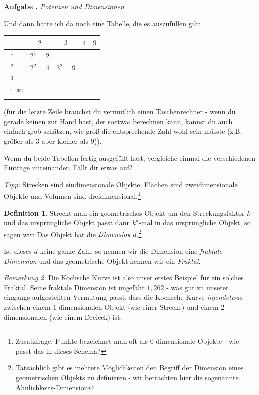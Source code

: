 \documentclass[a4paper,ngerman,12pt]{scrartcl}
\theoremstyle{definition}
\newtheorem{defn}{Definition}[]
\theoremstyle{plain}
\theoremstyle{remark}
\newtheorem{bem}[defn]{Bemerkung}
\newlength{\aufgabenskip}
\newcounter{aufgabennummer}
\newenvironment{aufgabe}[1]{
  \addtocounter{aufgabennummer}{1}
  \textbf{Aufgabe \theaufgabennummer.} \emph{#1} \par
}{\vspace{\aufgabenskip}}
\begin{document}
\begin{aufgabe}{Potenzen und Dimensionen}
Und dann hätte ich da noch eine Tabelle, die es auszufüllen gilt:
\begin{center}
	\renewcommand{\arraystretch}{2}
	\begin{tabular}{l||c|c|c|c}
				      & $2$ & $3$ & $4$ & $9$ \\\hline\hline
		$\boxed{\phantom{1}}^1$  & $2^1=2$	&   &  & \\\hline
		$\boxed{\phantom{1}}^2$  & $2^2=4$	& $3^2=9$ & \phantom{$4^2=16$} & \phantom{$9^2=81$}\\\hline
		$\boxed{\phantom{1}}^3$  & 	&   &  & \\\hline
		$\boxed{\phantom{1}}^{1,262}$  & 	&   &  &     	
	\end{tabular}
\end{center}
(für die letzte Zeile brauchst du vermutlich einen Taschenrechner - wenn du gerade keinen zur Hand hast, der soetwas berechnen kann, kannst du auch einfach grob schätzen, wie groß die entsprechende Zahl wohl sein müsste (z.B. größer als $3$ aber kleiner als $9$)).

Wenn du beide Tabellen fertig ausgefüllt hast, vergleiche einmal die verschiedenen Einträge miteinander. Fällt dir etwas auf?

\emph{Tipp:} Strecken sind eindimensionale Objekte, Flächen sind zweidimensionale Objekte und Volumen sind dreidimensional.\footnote{Zusatzfrage: Punkte bezeichnet man oft als 0-dimensionale Objekte - wie passt das in dieses Schema?}
\end{aufgabe}

\begin{defn}
Streckt man ein geometrisches Objekt um den Streckungsfaktor $k$ und das ursprüngliche Objekt passt dann $k^d$-mal in das ursprüngliche Objekt, so sagen wir: Das Objekt hat die \emph{Dimension $d$}.\footnote{Tatsächlich gibt es mehrere Möglichkeiten den Begriff der Dimension eines geometrischen Objekts zu definieren - wir betrachten hier die sogenannte \glqq Ähnlichkeits-Dimension\grqq{}}

Ist dieses $d$ keine ganze Zahl, so nennen wir die Dimension eine \emph{fraktale Dimension} und das geometrische Objekt nennen wir ein \emph{Fraktal}.
\end{defn}

\begin{bem}
Die Kochsche Kurve ist also unser erstes Beispiel für ein solches Fraktal. Seine fraktale Dimension ist ungefähr $1,262$ - was gut zu unserer eingangs aufgestellten Vermutung passt, dass die Kochsche Kurve \emph{irgendetwas} zwischen einem $1$-dimensionalen Objekt (wie einer Strecke) und einem 2-dimensionalen (wie einem Dreieck) ist.
\end{bem}
\end{document}
